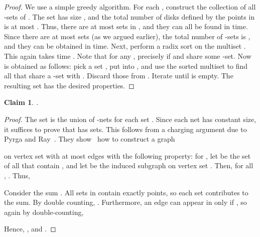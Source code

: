 \documentclass{siamltex}
\newtheorem{claim}[theorem]{Claim}
\begin{document}
\begin{proof} 
We use a simple greedy algorithm.
For each , construct the collection
 of all -sets of . The set  has size
, and the total number of disks defined by the points in 
is at most . Thus, there are at most  sets in 
,
and they can all be found in  time.
Since there are at most  sets  (as we argued earlier),
the total number of -sets is , and
they can be obtained in  time. 
Next, perform a radix sort on the multiset 
.
This again takes time .
Note that for any 
, 
precisely if  and  share some -set.
Now  is obtained as follows: pick a set ,
put  into , and use the sorted multiset  to find all 
 that share a -set with . Discard
those  from . Iterate until  
is empty. The resulting set  has the desired properties.
\end{proof}

\medskip

\begin{claim} \label{clm:netsize} .
\end{claim}

\begin{proof} The set  is the union of -nets
for each set . Since each net has constant size,
it suffices to prove that  has  sets. This follows from
a charging argument due to Pyrga and Ray~\cite[Theorem~12]{PyrgaRa08}.
They show~\cite[Lemma~7]{PyrgaRa08} how to construct a graph 

on vertex set  with at most  edges with 
the following property: for , let  be the set 
of all  that contain , and
let  be the induced subgraph 
on vertex set . Then, for all ,  .
Thus,

Consider the sum . All sets
in  contain exactly  points, so each set
contributes  to the sum. By double counting,
. 
Furthermore, an edge 
 can
appear in  only if , so again
by double-counting,

Hence, 
, and
.
\end{proof}
\end{document}
